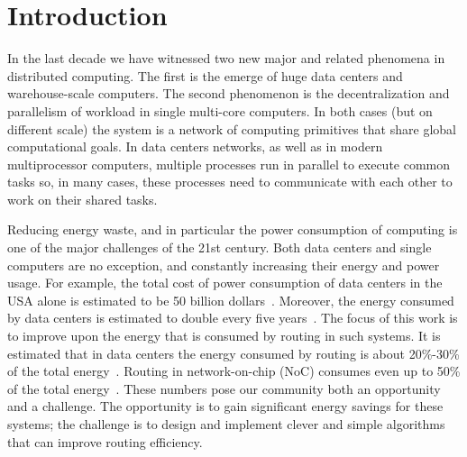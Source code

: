 \documentclass[conference]{IEEEtran}
\begin{document}
\section{Introduction}\label{sec:intro}












In the last decade we have witnessed two new major and related phenomena in distributed computing. The first is the emerge of huge data centers and warehouse-scale computers. The second phenomenon is the decentralization and parallelism of workload in single multi-core computers. In both cases (but on different scale) the system is a network of computing primitives that share global computational goals. In data centers networks, as well as in modern multiprocessor computers, multiple processes run in parallel to execute common tasks so, in many cases, these processes need to communicate with each other to work on their shared tasks.

Reducing energy waste, and in particular the power consumption of computing is one of the major challenges of the 21st century.
Both data centers and single computers are no exception, and constantly increasing their energy and power usage. For example, the total cost of power consumption of data centers in the USA alone is estimated to be 50 billion dollars~\cite{poess2008energy}. Moreover, the energy consumed by data centers is estimated to double every five years~\cite{energy2007report}. The focus of this work is to improve upon the energy that is consumed by routing in such systems. It is estimated that in data centers the energy consumed by routing is about 20\%-30\% of the total energy~\cite{heller2010elastictree}. Routing in network-on-chip (NoC) consumes even up to 50\% of the total energy~\cite{mirza2007empirical}. These numbers pose our community both an opportunity and a challenge. The opportunity is to gain significant energy savings for these systems; the challenge is to design and implement clever and simple algorithms that can improve routing efficiency.
\end{document}
